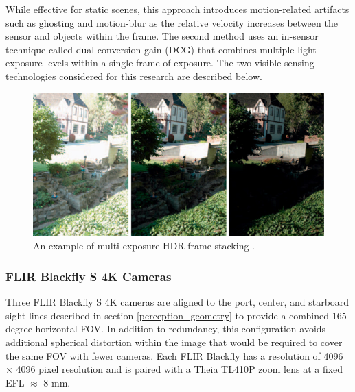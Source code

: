 \documentclass{erauthesis}
\begin{document}
While effective for static scenes, this approach introduces motion-related artifacts such as ghosting and motion-blur as the relative velocity increases between the sensor and objects within the frame.
The second method uses an in-sensor technique called dual-conversion gain (DCG) that combines multiple light exposure levels within a single frame of exposure. 
The two visible sensing technologies considered for this research are described below.

\begin{figure}[htbp]
    \centering
    \includegraphics[width=0.65\linewidth]{Images/hdr_example.png}
    \caption{An example of multi-exposure HDR frame-stacking \cite{Reinhard2010}.}
    \label{fig:hdr_example}
\end{figure}
\subsubsection{FLIR Blackfly S 4K Cameras} \label{sensors_FLIR}

Three FLIR Blackfly S 4K cameras are aligned to the port, center, and starboard sight-lines described in section \ref{perception_geometry} to provide a combined 165-degree horizontal \ac{FOV}.
In addition to redundancy, this configuration avoids additional spherical distortion within the image that would be required to cover the same \ac{FOV} with fewer cameras.
Each FLIR Blackfly has a resolution of 4096 $\times$ 4096 pixel resolution and is paired with a Theia TL410P zoom lens at a fixed \ac{EFL} $\approx$ 8 mm.
\end{document}
